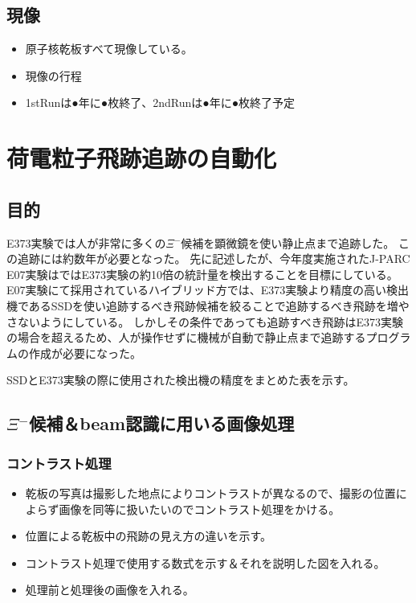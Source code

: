 \documentclass[12pt,a4paper]{jarticle}
\begin{document}
\subsection{現像}
\begin{itemize}
 \item 原子核乾板すべて現像している。
 \item 現像の行程
 \item 1stRunは●年に●枚終了、2ndRunは●年に●枚終了予定
\end{itemize}



\newpage
\section{荷電粒子飛跡追跡の自動化}
\subsection{目的}
E373実験では人が非常に多くの$\Xi$$^-$候補を顕微鏡を使い静止点まで追跡した。
この追跡には約数年が必要となった。
先に記述したが、今年度実施されたJ-PARC E07実験はではE373実験の約10倍の統計量を検出することを目標にしている。
E07実験にて採用されているハイブリッド方では、E373実験より精度の高い検出機であるSSDを使い追跡するべき飛跡候補を絞ることで追跡するべき飛跡を増やさないようにしている。
しかしその条件であっても追跡すべき飛跡はE373実験の場合を超えるため、人が操作せずに機械が自動で静止点まで追跡するプログラムの作成が必要になった。
\par
SSDとE373実験の際に使用された検出機の精度をまとめた表を示す。
\subsection{$\Xi$$^-$候補＆beam認識に用いる画像処理}
\subsubsection{コントラスト処理}
\begin{itemize}
    \item 乾板の写真は撮影した地点によりコントラストが異なるので、撮影の位置によらず画像を同等に扱いたいのでコントラスト処理をかける。
    \item 位置による乾板中の飛跡の見え方の違いを示す。
    \item コントラスト処理で使用する数式を示す＆それを説明した図を入れる。
    \item 処理前と処理後の画像を入れる。
\end{itemize}
\end{document}
